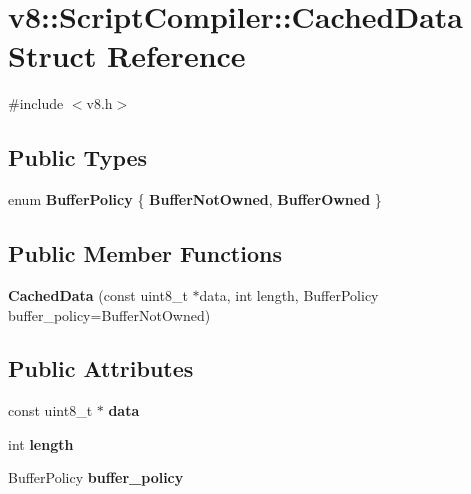 \hypertarget{structv8_1_1_script_compiler_1_1_cached_data}{}\section{v8\+:\+:Script\+Compiler\+:\+:Cached\+Data Struct Reference}
\label{structv8_1_1_script_compiler_1_1_cached_data}


{\ttfamily \#include $<$v8.\+h$>$}

\subsection*{Public Types}
\begin{DoxyCompactItemize}
\item 
\hypertarget{structv8_1_1_script_compiler_1_1_cached_data_ac1a1055d361e89b589c3fa98b79b9c25}{}enum {\bfseries Buffer\+Policy} \{ {\bfseries Buffer\+Not\+Owned}, 
{\bfseries Buffer\+Owned}
 \}\label{structv8_1_1_script_compiler_1_1_cached_data_ac1a1055d361e89b589c3fa98b79b9c25}

\end{DoxyCompactItemize}
\subsection*{Public Member Functions}
\begin{DoxyCompactItemize}
\item 
\hypertarget{structv8_1_1_script_compiler_1_1_cached_data_ab45b2bd22aa86eafd0b8eecbdc72d44e}{}{\bfseries Cached\+Data} (const uint8\+\_\+t $\ast$data, int length, Buffer\+Policy buffer\+\_\+policy=Buffer\+Not\+Owned)\label{structv8_1_1_script_compiler_1_1_cached_data_ab45b2bd22aa86eafd0b8eecbdc72d44e}

\end{DoxyCompactItemize}
\subsection*{Public Attributes}
\begin{DoxyCompactItemize}
\item 
\hypertarget{structv8_1_1_script_compiler_1_1_cached_data_a31e313a969170116f98d5a76c110fe61}{}const uint8\+\_\+t $\ast$ {\bfseries data}\label{structv8_1_1_script_compiler_1_1_cached_data_a31e313a969170116f98d5a76c110fe61}

\item 
\hypertarget{structv8_1_1_script_compiler_1_1_cached_data_ad7b8b1b672095a2c33621d3d5b5c7f8f}{}int {\bfseries length}\label{structv8_1_1_script_compiler_1_1_cached_data_ad7b8b1b672095a2c33621d3d5b5c7f8f}

\item 
\hypertarget{structv8_1_1_script_compiler_1_1_cached_data_a1e5c9ff625ac790139aec4294493fe32}{}Buffer\+Policy {\bfseries buffer\+\_\+policy}\label{structv8_1_1_script_compiler_1_1_cached_data_a1e5c9ff625ac790139aec4294493fe32}

\end{DoxyCompactItemize}


